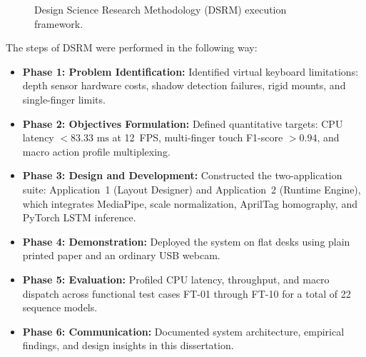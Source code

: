 \begin{figure}[htbp]
\centering
{}
\caption{Design Science Research Methodology (DSRM) execution framework.}
\label{fig:dsrm_process_flow}
\end{figure}

The steps of DSRM were performed in the following way:
\begin{itemize}
    \item \textbf{Phase 1: Problem Identification:} Identified virtual keyboard limitations: depth sensor hardware costs, shadow detection failures, rigid mounts, and single-finger limits.
    \item \textbf{Phase 2: Objectives Formulation:} Defined quantitative targets: CPU latency $< 83.33\text{ ms}$ at 12~FPS, multi-finger touch F1-score $> 0.94$, and macro action profile multiplexing.
    \item \textbf{Phase 3: Design and Development:} Constructed the two-application suite: Application~1 (Layout Designer) and Application~2 (Runtime Engine), which integrates MediaPipe, scale normalization, AprilTag homography, and PyTorch LSTM inference.
    \item \textbf{Phase 4: Demonstration:} Deployed the system on flat desks using plain printed paper and an ordinary USB webcam.
    \item \textbf{Phase 5: Evaluation:} Profiled CPU latency, throughput, and macro dispatch across functional test cases FT-01 through FT-10 for a total of 22 sequence models.
    \item \textbf{Phase 6: Communication:} Documented system architecture, empirical findings, and design insights in this dissertation.
\end{itemize}

